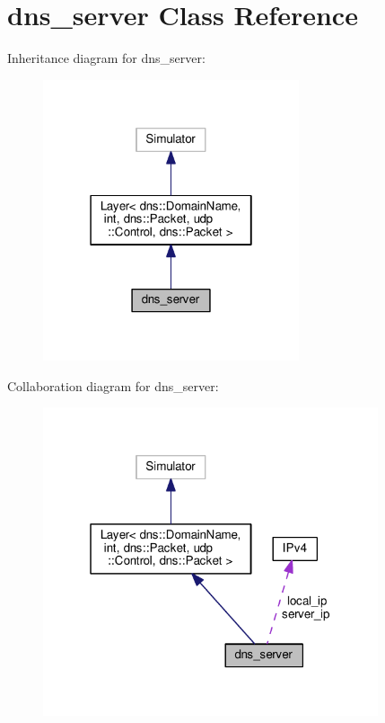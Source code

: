 \hypertarget{classdns__server}{}\section{dns\+\_\+server Class Reference}
\label{classdns__server}


Inheritance diagram for dns\+\_\+server\+:
\nopagebreak
\begin{figure}[H]
\begin{center}
\leavevmode
\includegraphics[width=214pt]{classdns__server__inherit__graph}
\end{center}
\end{figure}


Collaboration diagram for dns\+\_\+server\+:
\nopagebreak
\begin{figure}[H]
\begin{center}
\leavevmode
\includegraphics[width=280pt]{classdns__server__coll__graph}
\end{center}
\end{figure}
